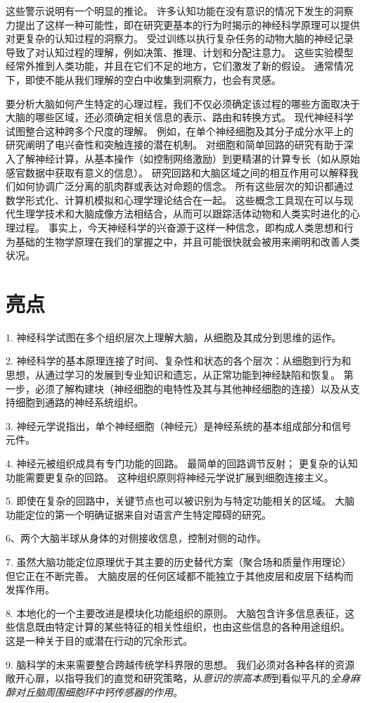 这些警示说明有一个明显的推论。
许多认知功能在没有意识的情况下发生的洞察力提出了这样一种可能性，即在研究更基本的行为时揭示的神经科学原理可以提供对更复杂的认知过程的洞察力。
受过训练以执行复杂任务的动物大脑的神经记录导致了对认知过程的理解，例如决策、推理、计划和分配注意力。 
这些实验模型经常外推到人类功能，并且在它们不足的地方，它们激发了新的假设。
通常情况下，即使不能从我们理解的空白中收集到洞察力，也会有灵感。


要分析大脑如何产生特定的心理过程，我们不仅必须确定该过程的哪些方面取决于大脑的哪些区域，还必须确定相关信息的表示、路由和转换方式。
现代神经科学试图整合这种跨多个尺度的理解。
例如，在单个神经细胞及其分子成分水平上的研究阐明了电兴奋性和突触连接的潜在机制。
对细胞和简单回路的研究有助于深入了解神经计算，从基本操作（如控制网络激励）到更精湛的计算专长（如从原始感官数据中获取有意义的信息）。
研究回路和大脑区域之间的相互作用可以解释我们如何协调广泛分离的肌肉群或表达对命题的信念。
所有这些层次的知识都通过数学形式化、计算机模拟和心理学理论结合在一起。
这些概念工具现在可以与现代生理学技术和大脑成像方法相结合，从而可以跟踪活体动物和人类实时进化的心理过程。
事实上，今天神经科学的兴奋源于这样一种信念，即构成人类思想和行为基础的生物学原理在我们的掌握之中，并且可能很快就会被用来阐明和改善人类状况。




\section{亮点}

1. 神经科学试图在多个组织层次上理解大脑，从细胞及其成分到思维的运作。


2. 神经科学的基本原理连接了时间、复杂性和状态的各个层次：从细胞到行为和思想，从通过学习的发展到专业知识和遗忘，从正常功能到神经缺陷和恢复。
第一步，必须了解构建块（神经细胞的电特性及其与其他神经细胞的连接）以及从支持细胞到通路的神经系统组织。


3. 神经元学说指出，单个神经细胞（神经元）是神经系统的基本组成部分和信号元件。


4. 神经元被组织成具有专门功能的回路。
最简单的回路调节反射；
更复杂的认知功能需要更复杂的回路。
这种组织原则将神经元学说扩展到细胞连接主义。


5. 即使在复杂的回路中，关键节点也可以被识别为与特定功能相关的区域。
大脑功能定位的第一个明确证据来自对语言产生特定障碍的研究。


6、两个大脑半球从身体的对侧接收信息，控制对侧的动作。


7. 虽然大脑功能定位原理优于其主要的历史替代方案（聚合场和质量作用理论）但它正在不断完善。
大脑皮层的任何区域都不能独立于其他皮层和皮层下结构而发挥作用。


8. 本地化的一个主要改进是模块化功能组织的原则。
大脑包含许多信息表征，这些信息既由特定计算的某些特征的相关性组织，也由这些信息的各种用途组织。
这是一种关于目的或潜在行动的冗余形式。


9. 脑科学的未来需要整合跨越传统学科界限的思想。
我们必须对各种各样的资源敞开心扉，以指导我们的直觉和研究策略，从\textit{意识的崇高本质}到看似平凡的\textit{全身麻醉对丘脑周围细胞环中钙传感器的作用}。

